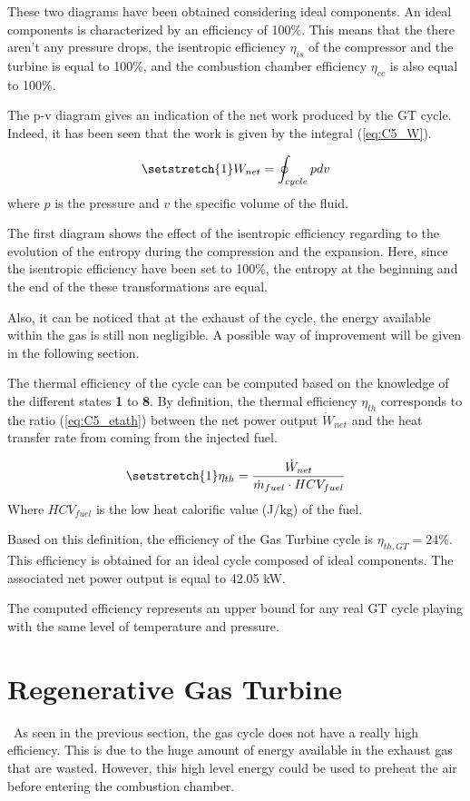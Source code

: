 These two diagrams have been obtained considering ideal components. An ideal components is characterized by an efficiency of 100\%. This means that the there aren't any pressure drops, the isentropic efficiency $\eta_{is}$ of the compressor and the turbine is equal to 100\%, and the combustion chamber efficiency $\eta_{cc}$ is also equal to 100\%.

The p-v diagram gives an indication of the net work produced by the GT cycle. Indeed, it has been seen that the work is given by the integral (\ref{eq:C5_W}).

\begin{equation}
    \setstretch{1}
    W_{net} = \oint_{cycle}pdv\label{eq:C5_W}
\end{equation}
where $p$ is the pressure and $v$ the specific volume of the fluid.

The first diagram shows the effect of the isentropic efficiency regarding to the evolution of the entropy during the compression and the expansion. Here, since the isentropic efficiency have been set to 100\%, the entropy at the beginning and the end of the these transformations are equal.

Also, it can be noticed that at the exhaust of the cycle, the energy available within the gas is still non negligible. A possible way of improvement will be given in the following section.

The thermal efficiency of the cycle can be computed based on the knowledge of the different states \textbf{1} to \textbf{8}. By definition, the thermal efficiency $\eta_{th}$ corresponds to the ratio (\ref{eq:C5_etath}) between the net power output $\dot{W}_{net}$ and the heat transfer rate from coming from the injected fuel.

\begin{equation}
    \setstretch{1}
    \eta_{th} = \frac{\dot{W}_{net}}{\dot{m}_{fuel}\cdot HCV_{fuel}} \label{eq:C5_etath}
\end{equation}
Where $HCV_{fuel}$ is the low heat calorific value (J/kg) of the fuel.

Based on this definition, the efficiency of the Gas Turbine cycle is $\eta_{th,GT} =24$\%. This efficiency is obtained for an ideal cycle composed of ideal components. The associated net power output is equal to 42.05 kW. 

The computed efficiency represents an upper bound for any real GT cycle playing with the same level of temperature and pressure.

\section{Regenerative Gas Turbine}
\quad\, As seen in the previous section, the gas cycle does not have a really high efficiency. This is due to the huge amount of energy available in the exhaust gas that are wasted. However, this high level energy could be used to preheat the air before entering the combustion chamber. 

